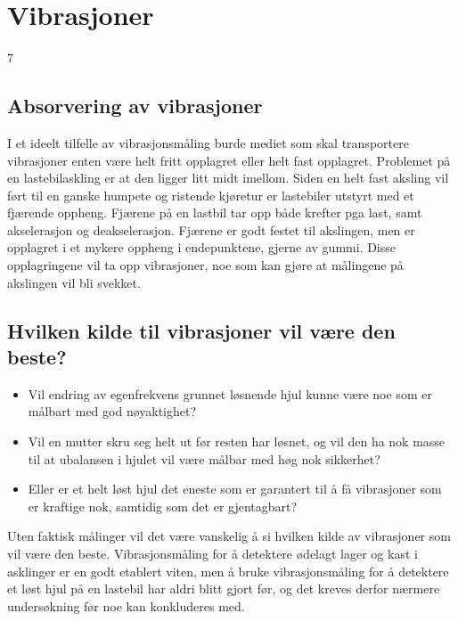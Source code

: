 \section{Vibrasjoner}7
\subsection{Absorvering av vibrasjoner}
I et ideelt tilfelle av vibrasjonsmåling burde mediet som skal transportere vibrasjoner 
enten være helt fritt opplagret eller helt fast opplagret. Problemet på en lastebilaskling 
er at den ligger litt midt imellom. Siden en helt fast aksling vil ført til en ganske humpete 
og ristende kjøretur er lastebiler utstyrt med et fjærende oppheng. Fjærene på en lastbil
 tar opp både krefter pga last, samt akselerasjon og deakselerasjon. Fjærene er godt 
festet til akslingen, men er opplagret i et mykere oppheng i endepunktene, gjerne av gummi. 
Disse opplagringene vil ta opp vibrasjoner, noe som kan gjøre at målingene på akslingen vil bli svekket.

\subsection{Hvilken kilde til vibrasjoner vil være den beste?}
\begin{itemize}
	\item Vil endring av egenfrekvens grunnet løsnende hjul kunne være noe som er 
målbart med god nøyaktighet?
	\item Vil en mutter skru seg helt ut før resten har
 løsnet, og vil den ha nok masse til at ubalansen i hjulet vil være målbar med 
høg nok sikkerhet? 
	\item Eller er et helt løst hjul det eneste som er garantert til å få 
vibrasjoner som er kraftige nok, samtidig som det er gjentagbart?
\end{itemize}
Uten faktisk målinger vil det være vanskelig å si hvilken kilde av vibrasjoner 
som vil være den beste. Vibrasjonsmåling for å detektere ødelagt lager og 
kast i asklinger er en godt etablert viten, men å bruke vibrasjonsmåling for 
å detektere et løst hjul på en lastebil har aldri blitt gjort før, og det kreves 
derfor nærmere undersøkning før noe kan konkluderes med. 
